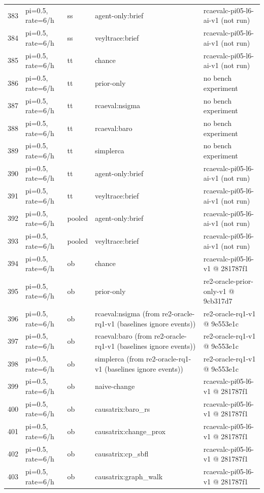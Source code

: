 \begin{longtable}{@{}r>{\raggedright\arraybackslash}p{48.0pt}>{\raggedright\arraybackslash}p{18.0pt}>{\raggedright\arraybackslash}p{108.0pt}>{\raggedright\arraybackslash}p{105.0pt}@{}}
383 & pi=0.5, rate=6/h & ss & agent-only:brief & rcaevalc-pi05-l6-ai-v1 (not run) \\
384 & pi=0.5, rate=6/h & ss & veyltrace:brief & rcaevalc-pi05-l6-ai-v1 (not run) \\
385 & pi=0.5, rate=6/h & tt & chance & rcaevalc-pi05-l6-ai-v1 (not run) \\
386 & pi=0.5, rate=6/h & tt & prior-only & no bench experiment \\
387 & pi=0.5, rate=6/h & tt & rcaeval:nsigma & no bench experiment \\
388 & pi=0.5, rate=6/h & tt & rcaeval:baro & no bench experiment \\
389 & pi=0.5, rate=6/h & tt & simplerca & no bench experiment \\
390 & pi=0.5, rate=6/h & tt & agent-only:brief & rcaevalc-pi05-l6-ai-v1 (not run) \\
391 & pi=0.5, rate=6/h & tt & veyltrace:brief & rcaevalc-pi05-l6-ai-v1 (not run) \\
392 & pi=0.5, rate=6/h & pooled & agent-only:brief & rcaevalc-pi05-l6-ai-v1 (not run) \\
393 & pi=0.5, rate=6/h & pooled & veyltrace:brief & rcaevalc-pi05-l6-ai-v1 (not run) \\
394 & pi=0.5, rate=6/h & ob & chance & rcaevalc-pi05-l6-v1 @ 281787f1 \\
395 & pi=0.5, rate=6/h & ob & prior-only & re2-oracle-prior-only-v1 @ 9cb317d7 \\
396 & pi=0.5, rate=6/h & ob & rcaeval:nsigma (from re2-oracle-rq1-v1 (baselines ignore events)) & re2-oracle-rq1-v1 @ 9e553e1c \\
397 & pi=0.5, rate=6/h & ob & rcaeval:baro (from re2-oracle-rq1-v1 (baselines ignore events)) & re2-oracle-rq1-v1 @ 9e553e1c \\
398 & pi=0.5, rate=6/h & ob & simplerca (from re2-oracle-rq1-v1 (baselines ignore events)) & re2-oracle-rq1-v1 @ 9e553e1c \\
399 & pi=0.5, rate=6/h & ob & naive-change & rcaevalc-pi05-l6-v1 @ 281787f1 \\
400 & pi=0.5, rate=6/h & ob & causatrix:baro\_rs & rcaevalc-pi05-l6-v1 @ 281787f1 \\
401 & pi=0.5, rate=6/h & ob & causatrix:change\_prox & rcaevalc-pi05-l6-v1 @ 281787f1 \\
402 & pi=0.5, rate=6/h & ob & causatrix:cp\_sbfl & rcaevalc-pi05-l6-v1 @ 281787f1 \\
403 & pi=0.5, rate=6/h & ob & causatrix:graph\_walk & rcaevalc-pi05-l6-v1 @ 281787f1 \\

\end{longtable}
